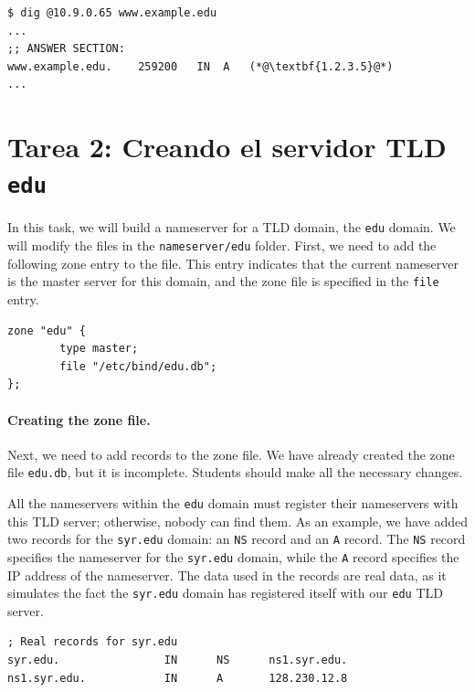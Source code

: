 \begin{lstlisting}
$ dig @10.9.0.65 www.example.edu
... 
;; ANSWER SECTION:
www.example.edu.    259200   IN  A   (*@\textbf{1.2.3.5}@*)
...
\end{lstlisting}





\section{Tarea 2: Creando el servidor TLD \texttt{edu}}


In this task, we will build a nameserver for a TLD domain, 
the \texttt{edu} domain.
We will modify the files in the \texttt{nameserver/edu} folder. 
First, we need to  add the following zone entry to the
 file. This entry indicates that the current nameserver
is the master server for this domain, and the zone file is
specified in the \texttt{file} entry.

\begin{lstlisting}
zone "edu" {
        type master;
        file "/etc/bind/edu.db";
};
\end{lstlisting}


\paragraph{Creating the zone file.} Next, we need to
add records to the zone file. 
We have already created the zone file \texttt{edu.db},
but it is incomplete. Students should make all the 
necessary changes. 

All the nameservers within the \texttt{edu} domain
must register their nameservers with this 
TLD server; otherwise, nobody can find them. As an example,
we have added two records for the \texttt{syr.edu} domain: 
an \texttt{NS} record and an \texttt{A} record.
The \texttt{NS} record specifies the nameserver for the 
\texttt{syr.edu} domain, while the \texttt{A} record
specifies the IP address of the nameserver. The
data used in the records are real data, as it simulates
the fact the \texttt{syr.edu} domain has registered 
itself with our \texttt{edu} TLD server.

\begin{lstlisting}
; Real records for syr.edu
syr.edu.                IN      NS      ns1.syr.edu.
ns1.syr.edu.            IN      A       128.230.12.8
\end{lstlisting}
 

